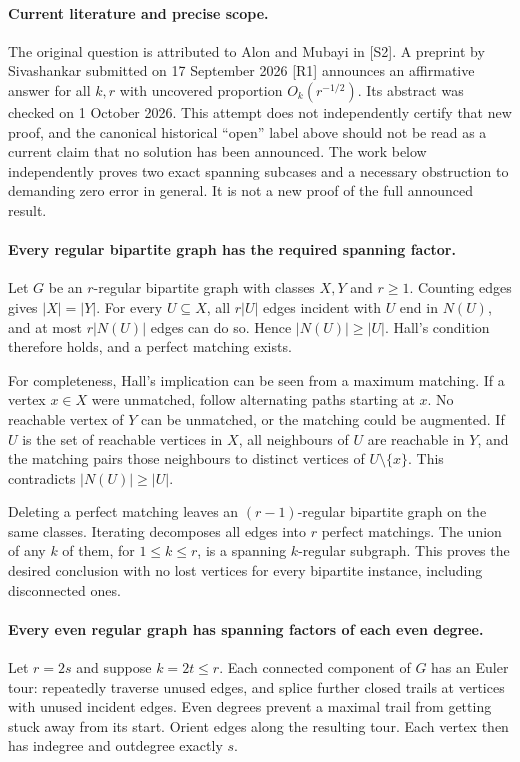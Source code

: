 \documentclass[11pt,a4paper]{article}
\begin{document}
\paragraph{Current literature and precise scope.}
The original question is attributed to Alon and Mubayi in [S2]. A
preprint by Sivashankar submitted on 17 September 2026 [R1] announces
an affirmative answer for all $k,r$ with uncovered proportion
$O_k(r^{-1/2})$. Its abstract was checked on 1 October 2026. This
attempt does not independently certify that new proof, and the canonical
historical ``open'' label above should not be read as a current claim
that no solution has been announced. The work below independently proves
two exact spanning subcases and a necessary obstruction to demanding
zero error in general. It is not a new proof of the full announced result.

\paragraph{Every regular bipartite graph has the required spanning factor.}
Let $G$ be an $r$-regular bipartite graph with classes $X,Y$ and
$r\ge1$. Counting edges gives $|X|=|Y|$. For every $U\subseteq X$,
all $r|U|$ edges incident with $U$ end in $N(U)$, and at most
$r|N(U)|$ edges can do so. Hence $|N(U)|\ge|U|$. Hall's condition
therefore holds, and a perfect matching exists.

For completeness, Hall's implication can be seen from a maximum
matching. If a vertex $x\in X$ were unmatched, follow alternating
paths starting at $x$. No reachable vertex of $Y$ can be unmatched,
or the matching could be augmented. If $U$ is the set of reachable
vertices in $X$, all neighbours of $U$ are reachable in $Y$, and
the matching pairs those neighbours to distinct vertices of
$U\setminus\{x\}$. This contradicts $|N(U)|\ge|U|$.

Deleting a perfect matching leaves an $(r-1)$-regular bipartite graph
on the same classes. Iterating decomposes all edges into $r$ perfect
matchings. The union of any $k$ of them, for $1\le k\le r$, is a
spanning $k$-regular subgraph. This proves the desired conclusion with
no lost vertices for every bipartite instance, including disconnected ones.

\paragraph{Every even regular graph has spanning factors of each even degree.}
Let $r=2s$ and suppose $k=2t\le r$. Each connected component of $G$
has an Euler tour: repeatedly traverse unused edges, and splice further
closed trails at vertices with unused incident edges. Even degrees
prevent a maximal trail from getting stuck away from its start.
Orient edges along the resulting tour. Each vertex then has indegree
and outdegree exactly $s$.
\end{document}
